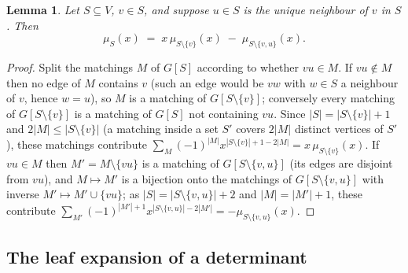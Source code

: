 \documentclass[11pt,a4paper]{article}
\newtheorem{lemma}[theorem]{Lemma}
\theoremstyle{definition}
\theoremstyle{remark}
\begin{document}
\begin{lemma}\label{lem:mu}
Let $S\subseteq V$, $v\in S$, and suppose $u\in S$ is the unique neighbour of $v$ in $S$. Then
\[
  \mu_S(x)\;=\;x\,\mu_{S\setminus\{v\}}(x)\;-\;\mu_{S\setminus\{v,u\}}(x).
\]
\end{lemma}
\begin{proof}
Split the matchings $M$ of $G[S]$ according to whether $vu\in M$.
If $vu\notin M$ then no edge of $M$ contains $v$ (such an edge would be $vw$ with $w\in S$ a
neighbour of $v$, hence $w=u$), so $M$ is a matching of $G[S\setminus\{v\}]$; conversely every
matching of $G[S\setminus\{v\}]$ is a matching of $G[S]$ not containing $vu$. Since
$|S|=|S\setminus\{v\}|+1$ and $2|M|\le|S\setminus\{v\}|$ (a matching inside a set $S'$ covers
$2|M|$ distinct vertices of $S'$), these matchings contribute
$\sum_M(-1)^{|M|}x^{|S\setminus\{v\}|+1-2|M|}=x\,\mu_{S\setminus\{v\}}(x)$.
If $vu\in M$ then $M'=M\setminus\{vu\}$ is a matching of $G[S\setminus\{v,u\}]$ (its edges are
disjoint from $vu$), and $M\mapsto M'$ is a bijection onto the matchings of
$G[S\setminus\{v,u\}]$ with inverse $M'\mapsto M'\cup\{vu\}$; as $|S|=|S\setminus\{v,u\}|+2$
and $|M|=|M'|+1$, these contribute
$\sum_{M'}(-1)^{|M'|+1}x^{|S\setminus\{v,u\}|-2|M'|}=-\mu_{S\setminus\{v,u\}}(x)$.
\end{proof}

\subsection{The leaf expansion of a determinant}
\end{document}
